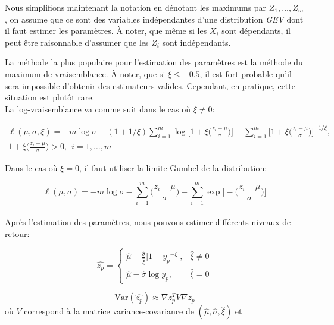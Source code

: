 \documentclass[11pt]{report}
\numberwithin{equation}{section}
\begin{document}
Nous simplifions maintenant la notation en dénotant les maximums par $Z_1,\dots,Z_m$, on assume que ce sont des variables indépendantes d'une distribution \textit{GEV} dont il faut estimer les paramètres. À noter, que même si les $X_i$ sont dépendants, il peut être raisonnable d'assumer que les $Z_i$ sont indépendants.

La méthode la plus populaire pour l'estimation des paramètres est la méthode du maximum de vraisemblance. À noter, que si $\xi \le -0.5$,  il est fort probable qu'il sera impossible d'obtenir des estimateurs valides. Cependant, en pratique, cette situation est plutôt rare.\\

La log-vraisemblance va comme suit dans le cas où $\xi \ne 0$:

\begin{equation}\label{eq:1.1.6}
\begin{gathered}
\ell(\mu,\sigma,\xi) = -m\log\sigma - (1+{1/\xi})\sum_{i = 1}^{m}\log\Big[1+\xi\Big(\frac{z_i- \mu}{\sigma} \Big) \Big] - 
\sum_{i = 1}^{m}\Big[1+\xi\Big(\frac{z_i- \mu}{\sigma} \Big) \Big]^{-1/\xi},\\
1+\xi\Big(\frac{z_i- \mu}{\sigma}\Big) > 0,\ \ i=1,\dots,m
\end{gathered}
\end{equation}

Dans le cas où $\xi = 0$, il faut utiliser la limite Gumbel de la distribution:

\begin{equation}\label{eq:1.1.7}
\ell(\mu,\sigma) = -m\log\sigma - \sum_{i = 1}^{m}\Big(\frac{z_i- \mu}{\sigma} \Big)  -
\sum_{i = 1}^{m}\exp\Big[-\Big(\frac{z_i- \mu}{\sigma} \Big) \Big]
\end{equation}
\\

Après l'estimation des paramètres, nous pouvons estimer différents niveaux de retour:

\begin{equation}\label{eq:1.1.8}
\hat{z_p} = 
\begin{cases}
\hat\mu - \frac{\hat\sigma}{\hat\xi}\Big[1 - {y_p}^{-\hat\xi}\Big], & \hat\xi \ne 0 \\
\hat\mu - \hat\sigma\log{y_p}, & \hat\xi = 0
\end{cases}
\end{equation}

\begin{equation}\label{eq:1.1.9}
\text{Var}(\hat{z_p}) \approx \nabla z_p^T V \nabla z_p
\end{equation}
où $V$ correspond à la matrice variance-covariance de $(\hat\mu, \hat\sigma, \hat\xi)$ et
\end{document}
